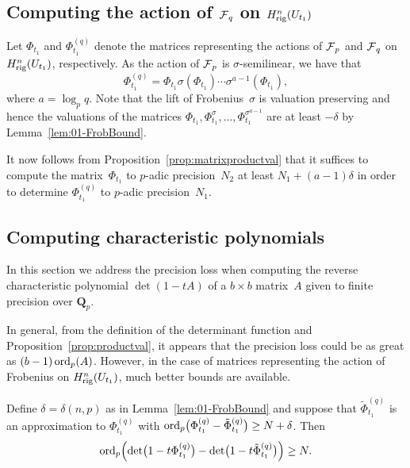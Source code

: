 \subsection{Computing the action of $\operatorname{\mathcal{F}}_q$ on $H_{\text{rig}}^{n}(U_{t_1})$}

Let $\Phi_{t_1}$ and $\Phi_{t_1}^{(q)}$ denote the matrices representing the 
actions of $\operatorname{\mathcal{F}}_p$ and $\operatorname{\mathcal{F}}_q$ on~$H_{\text{rig}}^{n}(U_{t_1})$, 
respectively.  As the action of $\operatorname{\mathcal{F}}_p$ is $\sigma$-semilinear, we have 
that 
\begin{equation*}
\Phi_{t_1}^{(q)} = 
    \Phi_{t_1} \sigma(\Phi_{t_1}) \dotsm \sigma^{a-1}(\Phi_{t_1}),
\end{equation*}
where $a = \log_p q$.  Note that the lift of Frobenius~$\sigma$ 
is valuation preserving and hence the valuations of the matrices 
$\Phi_{t_1}, \Phi_{t_1}^{\sigma}, \dotsc, \Phi_{t_1}^{\sigma^{a-1}}$ 
are at least $-\delta$ by Lemma~\ref{lem:01-FrobBound}.

It now follows from Proposition~\ref{prop:matrixproductval} that 
it suffices to compute the matrix~$\Phi_{t_1}$ to \mbox{$p$-adic} 
precision~$N_2$ at least \mbox{$N_1 + (a-1) \delta$} in order to 
determine $\Phi_{t_1}^{(q)}$ to \mbox{$p$-adic} precision~$N_1$.

\subsection{Computing characteristic polynomials}

In this section we address the precision loss when computing the reverse 
characteristic polynomial $\det(1 - t A)$ of a $b \times b$ matrix~$A$ 
given to finite precision over $\mathbf{Q}_p$.

In general, from the definition of the determinant function and 
Proposition~\ref{prop:productval}, it appears that the precision 
loss could be as great as $(b-1) \operatorname{ord}_p(A)$.  However, in the case 
of matrices representing the action of Frobenius 
on $H_{\text{rig}}^n(U_{t_1})$, much better bounds are available.

\begin{lem} \label{lem:charpoly}
Define $\delta = \delta(n,p)$ as in Lemma~\ref{lem:01-FrobBound} and 
suppose that $\tilde{\Phi}_{t_1}^{(q)}$ is an approximation to 
$\Phi_{t_1}^{(q)}$ with 
$\operatorname{ord}_p\bigl(\Phi_{t_1}^{(q)}-\tilde{\Phi}_{t_1}^{(q)}\bigr) \geq N + \delta$.
Then 
\begin{equation*}
\operatorname{ord}_p \Bigl( \det\bigl(1 - t \Phi_{t_1}^{(q)}\bigr) 
            - \det\bigl(1 - t \tilde{\Phi}_{t_1}^{(q)}\bigr) \Bigr) \geq N.
\end{equation*}
\end{lem}

